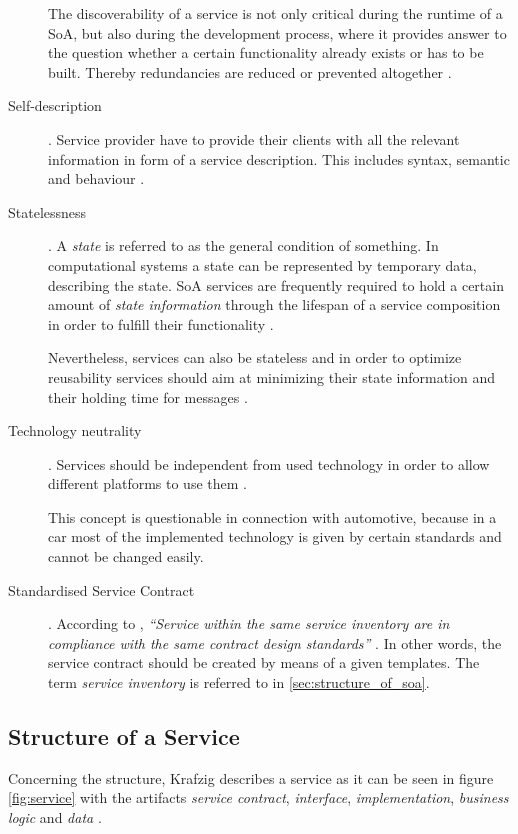 \begin{description}
The discoverability of a service is not only critical during the runtime of a SoA, but also during the development process, where it provides answer to the question whether a certain functionality already exists or has to be built. Thereby redundancies are reduced or prevented altogether \cite[ch.12]{erl2008} \cite{arrowhead} \cite{breivold} \cite[p.27]{erl2011}.

\item [Self-description].
Service provider have to provide their clients with all the relevant information in form of a service description. This includes syntax, semantic and behaviour \cite{breivold}.

\item [Statelessness].
A \emph{state} is referred to as the general condition of something. In computational systems a state can be represented by temporary data, describing the state. SoA services are frequently required to hold a certain amount of \emph{state information} through the lifespan of a service composition in order to fulfill their functionality \cite[ch.11]{erl2008}. 

Nevertheless, services can also be stateless and in order to optimize reusability services should aim at minimizing their state information and their holding time for messages \cite{breivold} \cite[p.27]{erl2011}.

\item [Technology neutrality].
Services should be independent from used technology in order to allow different platforms to use them \cite{breivold}. 

This concept is questionable in connection with automotive, because in a car most of the implemented technology is given by certain standards and cannot be changed easily.

\item [Standardised Service Contract].
According to \cite{erl2011}, \emph{``Service within the same service inventory are in compliance with the same contract design standards''} \cite[p.27]{erl2011}. In other words, the service contract should be created by means of a given templates. The term \emph{service inventory} is referred to in \ref{sec:structure_of_soa}.
\end{description}



\subsection{Structure of a Service}
\label{sec:service_structure}
Concerning the structure, Krafzig describes a service as it can be seen in figure \ref{fig:service} with the artifacts \emph{service contract}, \emph{interface}, \emph{implementation}, \emph{business logic} and \emph{data} \cite[p.44]{krafzig}.

